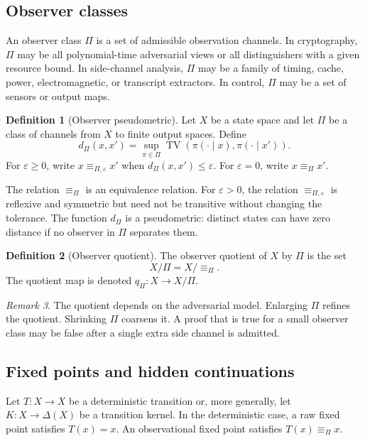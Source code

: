 \documentclass[11pt]{article}
\theoremstyle{definition}
\newtheorem{definition}{Definition}[section]
\theoremstyle{plain}
\theoremstyle{remark}
\newtheorem{remark}[definition]{Remark}
\DeclareMathOperator{\TV}{TV}
\newcommand{\DeltaS}{\Delta}
\newcommand{\eps}{\varepsilon}
\newcommand{\eqobs}{\equiv_{\Pi}}
\newcommand{\eqep}{\equiv_{\Pi,\eps}}
\begin{document}
\subsection{Observer classes}

An observer class $\Pi$ is a set of admissible observation channels. In cryptography, $\Pi$ may be all polynomial-time adversarial views or all distinguishers with a given resource bound. In side-channel analysis, $\Pi$ may be a family of timing, cache, power, electromagnetic, or transcript extractors. In control, $\Pi$ may be a set of sensors or output maps.

\begin{definition}[Observer pseudometric]
Let $X$ be a state space and let $\Pi$ be a class of channels from $X$ to finite output spaces. Define
\[
    d_{\Pi}(x,x')=\sup_{\pi\in\Pi}\TV(\pi(\cdot\mid x),\pi(\cdot\mid x')).
\]
For $\eps\ge 0$, write $x\eqep x'$ when $d_{\Pi}(x,x')\le \eps$. For $\eps=0$, write $x\eqobs x'$.
\end{definition}

The relation $\eqobs$ is an equivalence relation. For $\eps>0$, the relation $\eqep$ is reflexive and symmetric but need not be transitive without changing the tolerance. The function $d_{\Pi}$ is a pseudometric: distinct states can have zero distance if no observer in $\Pi$ separates them.

\begin{definition}[Observer quotient]
The observer quotient of $X$ by $\Pi$ is the set
\[
    X/\Pi = X/{\eqobs}.
\]
The quotient map is denoted $q_{\Pi}:X\to X/\Pi$.
\end{definition}

\begin{remark}
The quotient depends on the adversarial model. Enlarging $\Pi$ refines the quotient. Shrinking $\Pi$ coarsens it. A proof that is true for a small observer class may be false after a single extra side channel is admitted.
\end{remark}

\subsection{Fixed points and hidden continuations}

Let $T:X\to X$ be a deterministic transition or, more generally, let $K:X\to\DeltaS(X)$ be a transition kernel. In the deterministic case, a raw fixed point satisfies $T(x)=x$. An observational fixed point satisfies $T(x)\eqobs x$.
\end{document}

